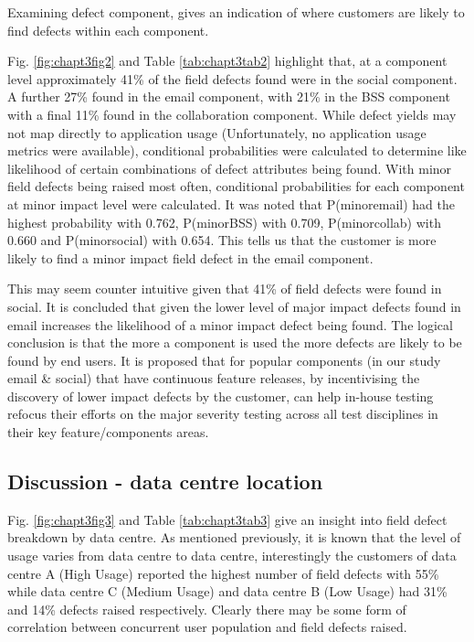 Examining defect component, gives an indication of where customers are likely to find defects within each component. \par
Fig. \ref{fig:chapt3fig2} and Table \ref{tab:chapt3tab2} highlight that, at a component level approximately 41\% of the field defects found were in the social component. A further 27\% found in the email component, with 21\% in the BSS component with a final 11\% found in the collaboration component. While defect yields may not map directly to application usage (Unfortunately, no application usage metrics were available), conditional probabilities were calculated to determine like likelihood of certain combinations of defect attributes being found. With minor field defects being raised most often, conditional probabilities  for each component at minor impact level were calculated. It was noted that  P(minor\textbar email) had the highest probability with 0.762, P(minor\textbar BSS) with 0.709, P(minor\textbar collab) with 0.660 and P(minor\textbar social) with 0.654. This tells us that the customer is more likely to find a minor impact field defect in the email component. \par

This may seem counter intuitive given that 41\% of field defects were found in social. It is concluded that given the lower level of major impact defects found in email increases the likelihood of a minor impact defect being found.  The logical conclusion is that the more a component is used the more defects are likely to be found by end users. It is proposed that for popular components (in our study email \& social) that have continuous feature releases, by incentivising the discovery of lower impact defects by the customer, can help in-house testing refocus their efforts on the major severity testing across all test disciplines in their key feature/components areas. 

\subsection{Discussion - data centre location}
Fig. \ref{fig:chapt3fig3} and Table \ref{tab:chapt3tab3} give an insight into field defect breakdown by data centre. As mentioned previously, it is known that the level of usage varies from data centre to data centre, interestingly the customers of data centre A (High Usage) reported the highest number of field defects with 55\% while data centre C (Medium Usage) and data centre B (Low Usage) had 31\% and 14\% defects raised respectively. Clearly there may be some form of correlation between concurrent user population and field defects raised. \par

